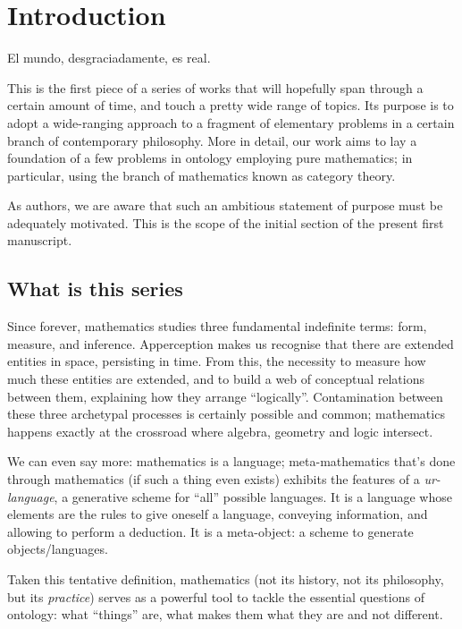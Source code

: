 \section{Introduction}\label{sec_intro}
\epigraph{El mundo, desgraciadamente, es real.}{\cite{confutacion}}
This is the first piece of a series of works that will hopefully span through a certain amount of time, and touch a pretty wide range of topics. Its purpose is to adopt a wide-ranging approach to a fragment of elementary problems in a certain branch of contemporary philosophy. More in detail, our work aims to lay a foundation of a few problems in ontology employing pure mathematics; in particular, using the branch of mathematics known as category theory.

As authors, we are aware that such an ambitious statement of purpose must be adequately motivated. This is the scope of the initial section of the present first manuscript.
\subsection{What is this series}

Since forever, mathematics studies three fundamental indefinite terms: form, measure, and inference. Apperception makes us recognise that there are extended entities in space, persisting in time. From this, the necessity to measure how much these entities are extended, and to build a web of conceptual relations between them, explaining how they arrange ``logically''.
Contamination between these three archetypal processes is certainly possible and common; mathematics happens exactly at the crossroad where algebra, geometry and logic intersect.

We can even say more: mathematics is a language; meta-mathematics that's done through mathematics (if such a thing even exists) exhibits the features of a \emph{ur-language}, a generative scheme for ``all'' possible languages. It is a language whose elements are the rules to give oneself a language, conveying information, and allowing to perform a deduction. It is a meta-object: a scheme to generate objects/languages.

Taken this tentative definition, mathematics (not its history, not its philosophy, but its \emph{practice}) serves as a powerful tool to tackle the essential questions of ontology: what ``things'' are, what makes them what they are and not different.

